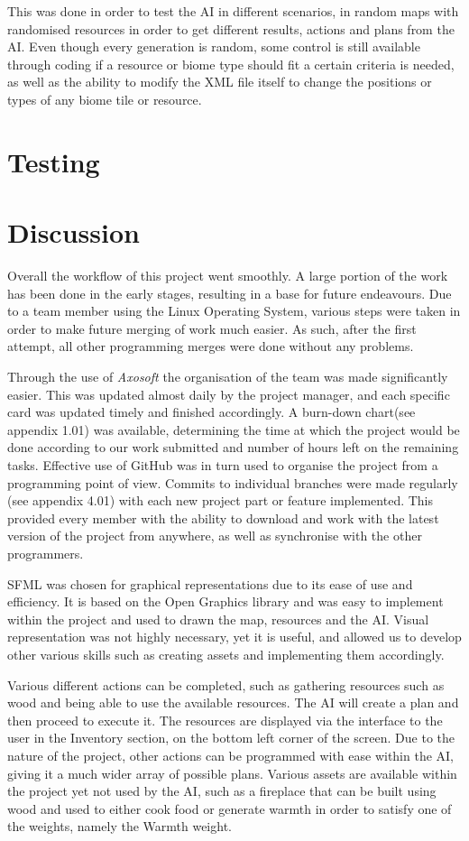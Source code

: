 \documentclass[a4paper]{report}
\begin{document}
This was done in order to test the AI in different scenarios, in random maps with randomised resources in order to get different results, actions and plans from the AI. Even though every generation is random, some control is still available through coding if a resource or biome type should fit a certain criteria is needed, as well as the ability to modify the XML file itself to change the positions or types of any biome tile or resource.

\chapter{Testing}
\chapter{Discussion}
Overall the workflow of this project went smoothly. A large portion of the work has been done in the early stages, resulting in a base for future endeavours. Due to a team member using the Linux Operating System, various steps were taken in order to make future merging of work much easier. As such, after the first attempt, all other programming merges were done without any problems. 

Through the use of \textit{Axosoft} the organisation of the team was made significantly easier. This was updated almost daily by the project manager, and each specific card was updated timely and finished accordingly. A burn-down chart(see appendix 1.01) was available, determining the time at which the project would be done according to our work submitted and number of hours left on the remaining tasks. Effective use of GitHub was in turn used to organise the project from a programming point of view. Commits to individual branches were made regularly (see appendix 4.01) with each new project part or feature implemented. This provided every member with the ability to download and work with the latest version of the project from anywhere, as well as synchronise with the other programmers.

SFML was chosen for graphical representations due to its ease of use and efficiency. It is based on the Open Graphics library and was easy to implement within the project and used to drawn the map, resources and the AI. Visual representation was not highly necessary, yet it is useful, and allowed us to develop other various skills such as creating assets and implementing them accordingly.

Various different actions can be completed, such as gathering resources such as wood and being able to use the available resources. The AI will create a plan and then proceed to execute it. The resources are displayed via the interface to the user in the Inventory section, on the bottom left corner of the screen. Due to the nature of the project, other actions can be programmed with ease within the AI, giving it a much wider array of possible plans. Various assets are available within the project yet not used by the AI, such as a fireplace that can be built using wood and used to either cook food or generate warmth in order to satisfy one of the weights, namely the Warmth weight.
\end{document}
